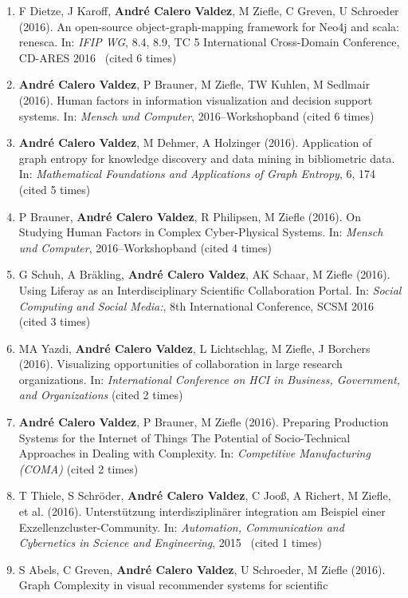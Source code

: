 \documentclass[11pt,a4paper,sans]{moderncv}
\begin{document}
\begin{enumerate}
\item
  F Dietze, J Karoff, \textbf{André Calero Valdez}, M Ziefle, C Greven,
  U Schroeder (2016). An open-source object-graph-mapping framework for
  Neo4j and scala: renesca. In: \emph{IFIP WG}, 8.4, 8.9, TC 5
  International Cross-Domain Conference, CD-ARES 2016~ (cited 6 times)
\item
  \textbf{André Calero Valdez}, P Brauner, M Ziefle, TW Kuhlen, M
  Sedlmair (2016). Human factors in information visualization and
  decision support systems. In: \emph{Mensch und Computer},
  2016--Workshopband (cited 6 times)
\item
  \textbf{André Calero Valdez}, M Dehmer, A Holzinger (2016).
  Application of graph entropy for knowledge discovery and data mining
  in bibliometric data. In: \emph{Mathematical Foundations and
  Applications of Graph Entropy}, 6, 174 (cited 5 times)
\item
  P Brauner, \textbf{André Calero Valdez}, R Philipsen, M Ziefle (2016).
  On Studying Human Factors in Complex Cyber-Physical Systems. In:
  \emph{Mensch und Computer}, 2016--Workshopband (cited 4 times)
\item
  G Schuh, A Bräkling, \textbf{André Calero Valdez}, AK Schaar, M Ziefle
  (2016). Using Liferay as an Interdisciplinary Scientific Collaboration
  Portal. In: \emph{Social Computing and Social Media:}, 8th
  International Conference, SCSM 2016~ (cited 3 times)
\item
  MA Yazdi, \textbf{André Calero Valdez}, L Lichtschlag, M Ziefle, J
  Borchers (2016). Visualizing opportunities of collaboration in large
  research organizations. In: \emph{International Conference on HCI in
  Business, Government, and Organizations} (cited 2 times)
\item
  \textbf{André Calero Valdez}, P Brauner, M Ziefle (2016). Preparing
  Production Systems for the Internet of Things The Potential of
  Socio-Technical Approaches in Dealing with Complexity. In:
  \emph{Competitive Manufacturing (COMA)} (cited 2 times)
\item
  T Thiele, S Schröder, \textbf{André Calero Valdez}, C Jooß, A Richert,
  M Ziefle, et al. (2016). Unterstützung interdisziplinärer integration
  am Beispiel einer Exzellenzcluster-Community. In: \emph{Automation,
  Communication and Cybernetics in Science and Engineering}, 2015~
  (cited 1 times)
\item
  S Abels, C Greven, \textbf{André Calero Valdez}, U Schroeder, M Ziefle
  (2016). Graph Complexity in visual recommender systems for scientific

\end{enumerate}
\end{document}
